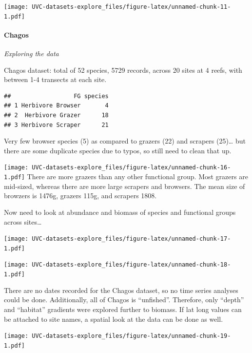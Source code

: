 \documentclass[]{article}
\let\oldparagraph\paragraph
\renewcommand{\paragraph}[1]{\oldparagraph{#1}\mbox{}}
\begin{document}
\texttt{[image: UVC-datasets-explore\_files/figure-latex/unnamed-chunk-11-1.pdf]}

\paragraph{Chagos}\label{chagos}

\emph{Exploring the data}

Chagos dataset: total of 52 species, 5729 records, across 20 sites at 4
reefs, with between 1-4 transects at each site.

\begin{verbatim}
##                  FG species
## 1 Herbivore Browser       4
## 2  Herbivore Grazer      18
## 3 Herbivore Scraper      21
\end{verbatim}

Very few browser species (5) as compared to grazers (22) and scrapers
(25)\ldots{} but there are some duplicate species due to typos, so still
need to clean that up.

\texttt{[image: UVC-datasets-explore\_files/figure-latex/unnamed-chunk-16-1.pdf]}
There are more grazers than any other functional group. Most grazers are
mid-sized, whereas there are more large scrapers and browsers. The mean
size of browzers is 1476g, grazers 115g, and scrapers 1808.

Now need to look at abundance and biomass of species and functional
groups across sites\ldots{}

\texttt{[image: UVC-datasets-explore\_files/figure-latex/unnamed-chunk-17-1.pdf]}

\texttt{[image: UVC-datasets-explore\_files/figure-latex/unnamed-chunk-18-1.pdf]}

There are no dates recorded for the Chagos dataset, so no time series
analyses could be done. Additionally, all of Chagos is ``unfished''.
Therefore, only ``depth'' and ``habitat'' gradients were explored
further to biomass. If lat long values can be attached to site names, a
spatial look at the data can be done as well.

\texttt{[image: UVC-datasets-explore\_files/figure-latex/unnamed-chunk-19-1.pdf]}
\end{document}
